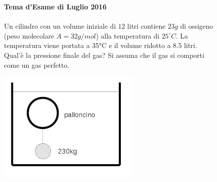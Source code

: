 \begin{figure}[h!]
	\textbf{Tema d'Esame di Luglio 2016}\\ \\
	Un cilindro con un volume iniziale di $12$ litri contiene $23 g$ di ossigeno (peso
molecolare $A = 32 g/mol$) alla temperatura di $25^{\circ}C$. La temperatura viene portata a 35°C e il
volume ridotto a 8.5 litri. Qual'è la pressione finale del gas? Si assuma che il gas si comporti
come un gas perfetto.

	\begin{center}
			\includegraphics[scale=1.1]{ES4/GIU042016.jpg}
	\end{center}
\end{figure}